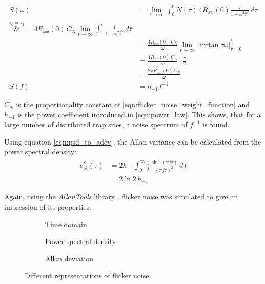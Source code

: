 \begin{align}
    S(\omega) &= \lim_{t \to \infty} \int_0^t N(\bar \tau) \, 4 R_{xx}(0) \frac{\bar \tau}{1 + \omega^2 \bar \tau^2} \, d\bar\tau \nonumber\\
    \overset{\bar \tau_0 = \bar \tau_1}&{=} 4 R_{xx}(0)\, C_N \lim_{t \to \infty} \int_0^t \frac{1}{1 + \omega^2 \bar\tau^2} \, d\bar\tau \nonumber\\
    &= \frac{4 R_{xx}(0)\, C_N}{\omega} \lim_{t \to \infty}  \arctan{\bar\tau \omega} \Big|_{\bar\tau=0}^t \nonumber\\
    &= \frac{4 R_{xx}(0)\, C_N}{\omega} \cdot \frac{\pi}{2} \nonumber\\
    &= \frac{2 \pi R_{xx}(0)\, C_N}{\omega}\\
    S(f) &= h_{-1} f^{-1}
\end{align}

$C_N$ is the proportionality constant of \ref{eqn:flicker_noise_weight_function} and $h_{-1}$ is the power coefficient introduced in \ref{eqn:power_law}. This shows, that for a large number of distributed trap sites, a noise spectrum of $f^{-1}$ is found.

Using equation \ref{eqn:psd_to_adev}, the Allan variance can be calculated from the power spectral density:
\begin{align}
    \sigma_A^2(\tau) &= 2 h_{-1} \int_0^\infty \frac{1}{f} \frac{\sin^4\left( \pi f \tau \right)}{(\pi f \tau)^2}\,df \nonumber\\
    &=2 \ln 2 \, h_{-1}
\end{align}

Again, using the \textit{AllanTools} library \cite{allantools}, flicker noise was simulated to give an impression of its properties.

\begin{figure}[ht]
    \centering
    \begin{subfigure}{0.32\linewidth}
        \centering
        \scalebox{0.75}{%
            
        } %
        \caption{Time domain}
        \label{fig:flicker_noise_time}
    \end{subfigure}
    \begin{subfigure}{0.32\linewidth}
        \centering
        \scalebox{0.75}{%
            
        } %
        \caption{Power spectral density}
        \label{fig:flicker_noise_psd}
    \end{subfigure}
    \begin{subfigure}{0.32\linewidth}
        \centering
        \scalebox{0.75}{%
            
        } %
        \caption{Allan deviation}
        \label{fig:flicker_noise_adev}
    \end{subfigure}
    \caption{Different representations of flicker noise.}
    \label{fig:flicker_noise_simulated}
\end{figure}

